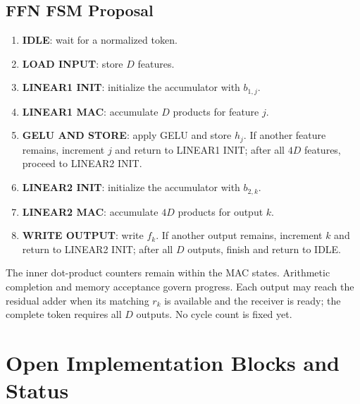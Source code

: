 \documentclass[11pt,a4paper]{article}
\begin{document}
\subsection{FFN FSM Proposal}

\begin{enumerate}
\item \textbf{IDLE}: wait for a normalized token.
\item \textbf{LOAD INPUT}: store $D$ features.
\item \textbf{LINEAR1 INIT}: initialize the accumulator with $b_{1,j}$.
\item \textbf{LINEAR1 MAC}: accumulate $D$ products for feature $j$.
\item \textbf{GELU AND STORE}: apply GELU and store $h_j$. If another feature remains, increment $j$ and return to LINEAR1 INIT; after all $4D$ features, proceed to LINEAR2 INIT.
\item \textbf{LINEAR2 INIT}: initialize the accumulator with $b_{2,k}$.
\item \textbf{LINEAR2 MAC}: accumulate $4D$ products for output $k$.
\item \textbf{WRITE OUTPUT}: write $f_k$. If another output remains, increment $k$ and return to LINEAR2 INIT; after all $D$ outputs, finish and return to IDLE.
\end{enumerate}
The inner dot-product counters remain within the MAC states. Arithmetic
completion and memory acceptance govern progress. Each output may reach the
residual adder when its matching $r_k$ is available and the receiver is ready;
the complete token requires all $D$ outputs. No cycle count is fixed yet.

\section{Open Implementation Blocks and Status}
\end{document}
